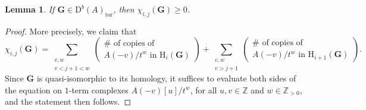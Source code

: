 \documentclass[12pt]{amsart}
\newtheorem{lemma}{Lemma}[section]
\theoremstyle{definition}
\theoremstyle{remark}
\newcommand{\HH}{\mathrm{H}}
\newcommand{\ZZ}{\mathbb{Z}}
\newcommand{\Gbull}{\mathbf{G}}
\newcommand{\DD}{\mathrm{D}}
\begin{document}
\begin{lemma}\label{lem:chi nonneg}
If $\Gbull\in \DD^b(A)_{\text{tor}}$, then $\chi_{i,j}(\Gbull)\geq 0$.
\end{lemma}
\begin{proof}
More precisely, we claim that
\[
\chi_{i,j}(\Gbull)=\sum_{\substack{v,w\\v<j+1<w}} \begin{pmatrix} \# \text{ of copies  of }\\ A(-v)/t^w \text{ in } \HH_i(\Gbull) \end{pmatrix} +
\sum_{\substack{v,w\\ v>j+1}}\begin{pmatrix} \# \text{ of copies of } \\ A(-v)/t^w \text{ in } \HH_{i+1}(\Gbull) \end{pmatrix}.
\]
Since $\Gbull$ is quasi-isomorphic to its homology, it suffices to evaluate both sides of the equation on $1$-term complexes $A(-v)[u]/t^w$, for all $u,v\in \ZZ$ and $w\in \ZZ_{>0}$, and the statement then follows.
\end{proof}
\end{document}
